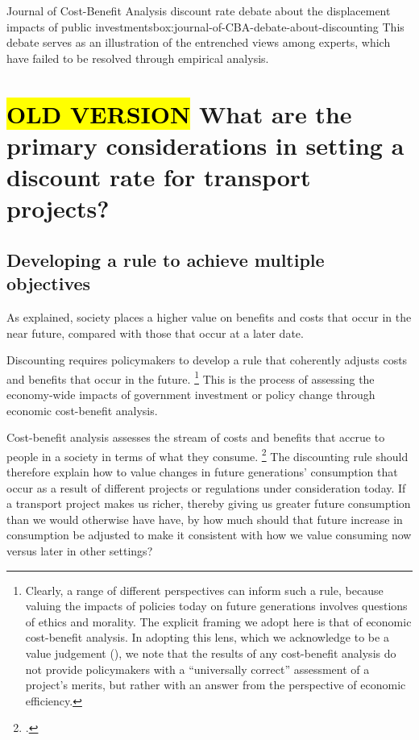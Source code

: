 \begin{bigbox}{Journal of Cost-Benefit Analysis discount rate debate about the displacement impacts of public investments}{box:journal-of-CBA-debate-about-discounting}
This debate serves as an illustration of the entrenched views among experts, which have failed to be resolved through empirical analysis.

\end{bigbox}






\chapter{\hl{OLD VERSION} What are the primary considerations in setting a discount rate for transport projects?}

\section{Developing a rule to achieve multiple objectives}
As  explained, society places a higher value on benefits and costs that occur in the near future, compared with those that occur at a later date.

Discounting requires policymakers to develop a rule that coherently adjusts costs and benefits that occur in the future.%
    \footnote{Clearly, a range of different perspectives can inform such a rule, because valuing the impacts of policies today on future generations involves questions of ethics and morality. The explicit framing we adopt here is that of economic cost-benefit analysis. In adopting this lens, which we acknowledge to be a value judgement (\textcite{Creedy-2007-Polic-Evaluation-A-Reminder}), we note that the results of any cost-benefit analysis do not provide policymakers with a ``universally correct'' assessment of a project's merits, but rather with an answer from the perspective of economic efficiency.}
This is the process of assessing the economy-wide impacts of government investment or policy change through economic cost-benefit analysis. 

Cost-benefit analysis assesses the stream of costs and benefits that accrue to people in a society in terms of what they consume.%
    \footcite[][xii]{Harrison-Valuing-the-Future}
The discounting rule should therefore explain how to value changes in future generations' consumption that occur as a result of different projects or regulations under consideration today. If a transport project makes us richer, thereby giving us greater future consumption than we would otherwise have have, by how much should that future increase in consumption be adjusted to make it consistent with how we value consuming now versus later in other settings?  

